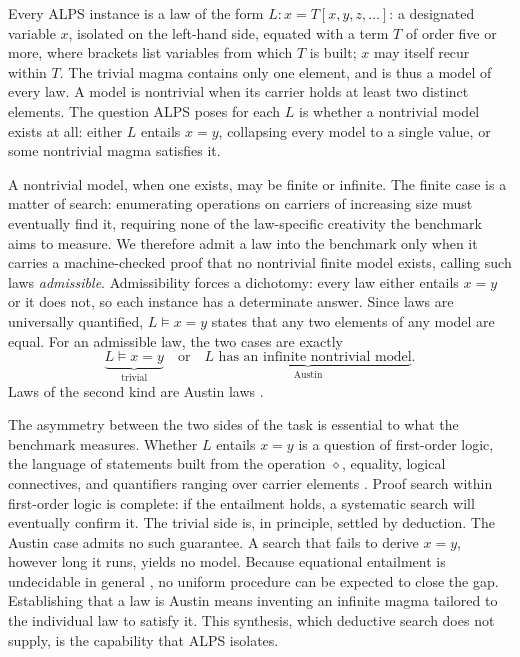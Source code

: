 \documentclass[letterpaper]{article} %
\newcommand{\op}{\diamond}
\begin{document}
Every ALPS instance is a law of the form $L\colon x = T[x, y, z, \dots]$: a designated variable $x$, isolated on the left-hand side, equated with a term $T$ of order five or more, where brackets list variables from which $T$ is built; $x$ may itself recur within $T$. The trivial magma contains only one element, and is thus a model of every law. A model is nontrivial when its carrier holds at least two distinct elements. The question ALPS poses for each $L$ is whether a nontrivial model exists at all: either $L$ entails $x = y$, collapsing every model to a single value, or some nontrivial magma satisfies it.

A nontrivial model, when one exists, may be finite or infinite. The finite case is a matter of search: enumerating operations on carriers of increasing size must eventually find it, requiring none of the law-specific creativity the benchmark aims to measure. We therefore admit a law into the benchmark only when it carries a machine-checked proof that no nontrivial finite model exists, calling such laws \textit{admissible}. Admissibility forces a dichotomy: every law either entails $x = y$ or it does not, so each instance has a determinate answer. Since laws are universally quantified, $L \models x = y$ states that any two elements of any model are equal. For an admissible law, the two cases are exactly
\begin{equation}
    \label{eq:dichotomy}
    \underbrace{L \models x = y}_{\text{trivial}}
    \quad\text{or}\quad
    \underbrace{L \text{ has an infinite nontrivial model}}_{\text{Austin}}.
\end{equation}
Laws of the second kind are Austin laws \citep{kisielewicz1997austin}.

The asymmetry between the two sides of the task is essential to what the benchmark measures. Whether $L$ entails $x = y$ is a question of first-order logic, the language of statements built from the operation $\op$, equality, logical connectives, and quantifiers ranging over carrier elements \citep{baader1998term}. Proof search within first-order logic is complete: if the entailment holds, a systematic search will eventually confirm it. The trivial side is, in principle, settled by deduction. The Austin case admits no such guarantee. A search that fails to derive $x = y$, however long it runs, yields no model. Because equational entailment is undecidable in general \citep{baader1998term}, no uniform procedure can be expected to close the gap. Establishing that a law is Austin means inventing an infinite magma tailored to the individual law to satisfy it. This synthesis, which deductive search does not supply, is the capability that ALPS isolates. 
\end{document}
